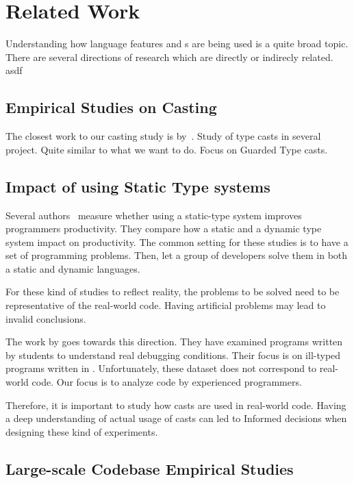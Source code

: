 
\chapter{Related Work}

Understanding how language features and \api{}s are being used is a quite broad topic.
There are several directions of research which are directly or indirecly related.
asdf


\section{Empirical Studies on Casting}

The closest work to our casting study is by~\cite{Winther:2011:GTP:2076674.2076680}.
Study of type casts in several project.
Quite similar to what we want to do.
Focus on Guarded Type casts.


\section{Impact of using Static Type systems}

Several authors~\cite{Stuchlik:2011:SVD:2047849.2047861,Mayer:2012:ESI:2384616.2384666,7911881} measure whether using a static-type system improves programmers productivity.
They compare how a static and a dynamic type system impact on productivity.
The common setting for these studies is to have a set of programming problems.
Then, let a group of developers solve them in both a static and dynamic languages.

For these kind of studies to reflect reality, the problems to be solved need to
be representative of the real-world code.
Having artificial problems may lead to invalid conclusions.

The work by \cite{Wu:2017:TEF:3152284.3133929,Wu:2017:LUF:3152284.3133930} goes towards this direction.
They have examined programs written by students to understand real debugging conditions.
Their focus is on ill-typed programs written in \haskell{}.
Unfortunately, these dataset does not correspond to real-world code.
Our focus is to analyze code by experienced programmers.

Therefore, it is important to study how casts are used in real-world code.
Having a deep understanding of actual usage of casts can led to
Informed decisions when designing these kind of experiments.

\section{Large-scale Codebase Empirical Studies}

